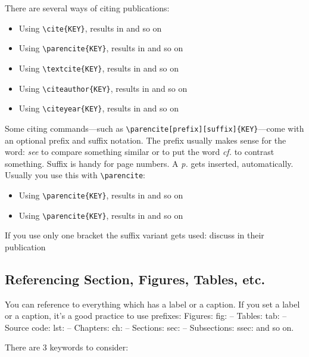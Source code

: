 There are several ways of citing publications:

\begin{itemize}
	\setlength\itemsep{-0.75em} %
	\item Using \verb|\cite{KEY}|, results in \cite{StaplesBieman1999} and so on 
	\item Using \verb|\parencite{KEY}|, results in \parencite{StaplesBieman1999} and so on 
	\item Using \verb|\textcite{KEY}|, results in \textcite{StaplesBieman1999} and so on 
	\item Using \verb|\citeauthor{KEY}|, results in \citeauthor{StaplesBieman1999} and so on 
	\item Using \verb|\citeyear{KEY}|, results in \citeyear{StaplesBieman1999} and so on 
\end{itemize}

Some citing commands---such as  \verb|\parencite[prefix][suffix]{KEY}|---come with an optional prefix and suffix notation. The prefix usually makes sense for the word: \textit{see} to compare something similar or to put the word \textit{cf.} to contrast something. Suffix is handy for page numbers. A \textit{p.} gets inserted, automatically. Usually you use this with \verb|\parencite|:

\begin{itemize}
	\setlength\itemsep{-0.75em} %
	\item Using \verb|\parencite{KEY}|, results in \parencite[see][96]{StaplesBieman1999} and so on
	\item Using \verb|\parencite{KEY}|, results in \parencite[cf.][64]{StaplesBieman1999} and so on 
\end{itemize}

If you use only one bracket the suffix variant gets used: \textcite[97]{StaplesBieman1999} discuss in their publication \textellipsis

\subsection{Referencing Section, Figures, Tables, etc.}

You can reference to everything which has a label or a caption. If you set a label or a caption, it’s a good practice to use prefixes: Figures: fig: -- Tables: tab: -- Source code: lst: -- Chapters: ch: -- Sections: sec: -- Subsections: ssec: and so on.

There are 3 keywords to consider:


